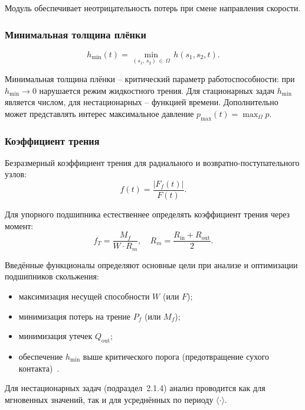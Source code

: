 Модуль обеспечивает неотрицательность потерь при смене направления
скорости.

\subsubsection*{Минимальная толщина плёнки}

\begin{equation}
  h_{\min}(t) = \min_{(s_1,\,s_2)\,\in\,\Omega}\,h(s_1,s_2,t).
  \label{eq:func_hmin}
\end{equation}

Минимальная толщина плёнки -- критический параметр работоспособности:
при $h_{\min} \to 0$ нарушается режим жидкостного трения.
Для стационарных задач $h_{\min}$ является числом,
для нестационарных -- функцией времени.
Дополнительно может представлять интерес максимальное давление
$p_{\max}(t) = \max_\Omega p$.

\subsubsection*{Коэффициент трения}

Безразмерный коэффициент трения для радиального
и возвратно-поступательного узлов:
\begin{equation}
  f(t) = \frac{|F_f(t)|}{F(t)}.
  \label{eq:func_f}
\end{equation}

Для упорного подшипника естественнее определять коэффициент трения
через момент:
\begin{equation}
  f_T = \frac{M_f}{W \cdot R_m},
  \quad
  R_m = \frac{R_{\mathrm{in}} + R_{\mathrm{out}}}{2}.
  \label{eq:func_fT}
\end{equation}


Введённые функционалы определяют основные цели при анализе
и оптимизации подшипников скольжения:
\begin{itemize}
  \item максимизация несущей способности $W$ (или $F$);
  \item минимизация потерь на трение $P_f$ (или $M_f$);
  \item минимизация утечек $Q_{\mathrm{out}}$;
  \item обеспечение $h_{\min}$ выше критического порога
        (предотвращение сухого контакта)~\cite{sfyris2012,chasalevris2012,chasalevris2013}.
\end{itemize}
Для нестационарных задач (подраздел~2.1.4) анализ проводится
как для мгновенных значений, так и для усреднённых по периоду
$\langle \cdot \rangle$.

